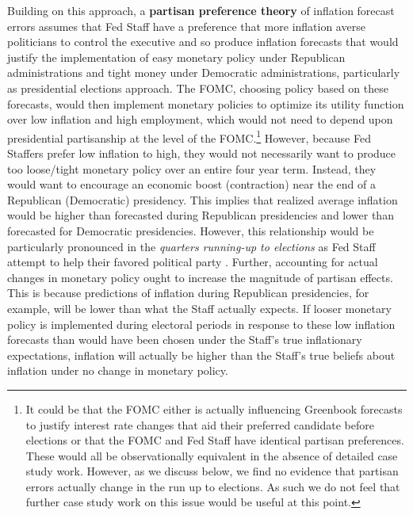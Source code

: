 \documentclass[a4paper]{article}
\begin{document}
Building on this approach, a {\bf{partisan preference theory}} of inflation forecast errors assumes that Fed Staff have a preference that more inflation averse politicians to control the executive and so produce inflation forecasts that would justify the implementation of easy monetary policy under Republican administrations and tight money under Democratic administrations, particularly as presidential elections approach. The FOMC, choosing policy based on these forecasts, would then implement monetary policies to optimize its utility function over low inflation and high employment, which would not need to depend upon presidential partisanship at the level of the FOMC.\footnote{It could be that the FOMC either is actually influencing Greenbook forecasts to justify interest rate changes that aid their preferred candidate before elections or that the FOMC and Fed Staff have identical partisan preferences. These would all be observationally equivalent in the absence of detailed case study work. However, as we discuss below, we find no evidence that partisan errors actually change in the run up to elections. As such we do not feel that further case study work on this issue would be useful at this point.} However, because Fed Staffers prefer low inflation to high, they would not necessarily want to produce too loose/tight monetary policy over an entire four year term. Instead, they would want to encourage an economic boost (contraction) near the end of a Republican (Democratic) presidency. This implies that realized average inflation would be higher than forecasted during Republican presidencies and lower than forecasted for Democratic presidencies. However, this relationship would be particularly pronounced in the {\emph{quarters running-up to elections}} as Fed Staff attempt to help their favored political party \citep{Beck1987,Grier1987}. Further, accounting for actual changes in monetary policy ought to increase the magnitude of partisan effects. This is because predictions of inflation during Republican presidencies, for example, will be lower than what the Staff actually expects. If looser monetary policy is implemented during electoral periods in response to these low inflation forecasts than would have been chosen under the Staff's true inflationary expectations, inflation will actually be higher than the Staff's true beliefs about inflation under no change in monetary policy.
\end{document}
